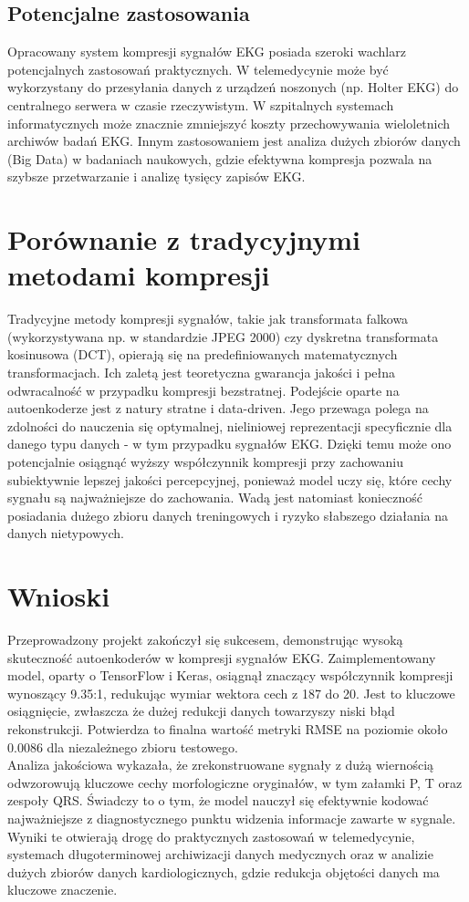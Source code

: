 \documentclass[12pt,a4paper]{article}
\begin{document}
\subsection{Potencjalne zastosowania}

Opracowany system kompresji sygnałów EKG posiada szeroki wachlarz potencjalnych zastosowań praktycznych. W telemedycynie może być wykorzystany do przesyłania danych z urządzeń noszonych (np. Holter EKG) do centralnego serwera w czasie rzeczywistym. W szpitalnych systemach informatycznych może znacznie zmniejszyć koszty przechowywania wieloletnich archiwów badań EKG. Innym zastosowaniem jest analiza dużych zbiorów danych (Big Data) w badaniach naukowych, gdzie efektywna kompresja pozwala na szybsze przetwarzanie i analizę tysięcy zapisów EKG.


\section{Porównanie z tradycyjnymi metodami kompresji}

Tradycyjne metody kompresji sygnałów, takie jak transformata falkowa (wykorzystywana np. w standardzie JPEG 2000) czy dyskretna transformata kosinusowa (DCT), opierają się na predefiniowanych matematycznych transformacjach. Ich zaletą jest teoretyczna gwarancja jakości i pełna odwracalność w przypadku kompresji bezstratnej. Podejście oparte na autoenkoderze jest z natury stratne i data-driven. Jego przewaga polega na zdolności do nauczenia się optymalnej, nieliniowej reprezentacji specyficznie dla danego typu danych - w tym przypadku sygnałów EKG. Dzięki temu może ono potencjalnie osiągnąć wyższy współczynnik kompresji przy zachowaniu subiektywnie lepszej jakości percepcyjnej, ponieważ model uczy się, które cechy sygnału są najważniejsze do zachowania. Wadą jest natomiast konieczność posiadania dużego zbioru danych treningowych i ryzyko słabszego działania na danych nietypowych.

\section{Wnioski}

Przeprowadzony projekt zakończył się sukcesem, demonstrując wysoką skuteczność autoenkoderów w kompresji sygnałów EKG. Zaimplementowany model, oparty o TensorFlow i Keras, osiągnął znaczący współczynnik kompresji wynoszący 9.35:1, redukując wymiar wektora cech z 187 do 20. Jest to kluczowe osiągnięcie, zwłaszcza że dużej redukcji danych towarzyszy niski błąd rekonstrukcji. Potwierdza to finalna wartość metryki RMSE na poziomie około 0.0086 dla niezależnego zbioru testowego. \\

Analiza jakościowa wykazała, że zrekonstruowane sygnały z dużą wiernością odwzorowują kluczowe cechy morfologiczne oryginałów, w tym załamki P, T oraz zespoły QRS. Świadczy to o tym, że model nauczył się efektywnie kodować najważniejsze z diagnostycznego punktu widzenia informacje zawarte w sygnale. Wyniki te otwierają drogę do praktycznych zastosowań w telemedycynie, systemach długoterminowej archiwizacji danych medycznych oraz w analizie dużych zbiorów danych kardiologicznych, gdzie redukcja objętości danych ma kluczowe znaczenie. \\
\end{document}
